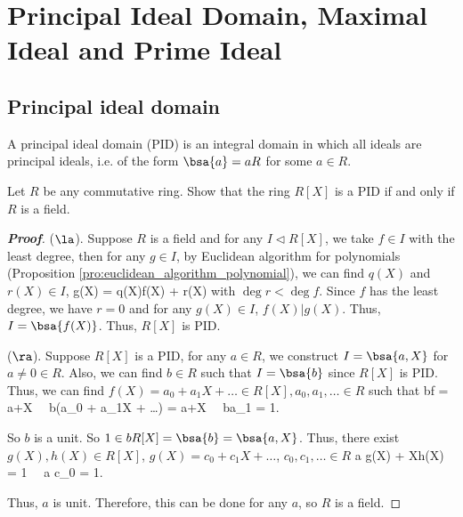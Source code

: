 

\section{Principal Ideal Domain, Maximal Ideal and Prime Ideal}

\subsection{Principal ideal domain}

\begin{definition}\label{def:principal_ideal_domain}
A principal ideal domain (PID) is an integral domain in which all ideals are principal ideals, i.e. of the form $\bsa{a} = aR$ for some $a \in R$.
\end{definition}


\begin{proposition}\label{pro:polynomial_pid_iff_field}
Let $R$ be any commutative ring. Show that the ring $R[X]$ is a PID if and only if $R$ is a field.%
\end{proposition}

\begin{proof}[\bf Proof]
($\la$). Suppose $R$ is a field and for any $I \lhd R[X]$, we take $f\in I$ with the least degree, then for any $g\in I$, by Euclidean algorithm for polynomials (Proposition \ref{pro:euclidean_algorithm_polynomial}), we can find $q(X)$ and $r(X)\in I$,
\be
g(X) = q(X)f(X) + r(X)
\ee
with $\deg r < \deg f$. Since $f$ has the least degree, we have $r = 0$ and for any $g(X)\in I$, $f(X)|g(X)$. Thus, $I = \bsa{f(X)}$. Thus, $R[X]$ is PID.

($\ra$). Suppose $R[X]$ is a PID, for any $a\in R$, we construct $I = \bsa{a,X}$ for $a\neq 0 \in R$. Also, we can find $b\in R$ such that $I = \bsa{b}$ since $R[X]$ is PID. Thus, we can find $f(X) = a_0 + a_1 X + \dots \in R[X], a_0,a_1,\dots \in R$ such that
\be
bf = a+X \ \ra \ b(a_0 + a_1X + \dots ) = a+X \ \ra \ ba_1 = 1.
\ee

So $b$ is a unit. So $1\in b R[X] = \bsa{b} = \bsa{a,X}$. Thus, there exist $g(X),h(X) \in R[X]$, $g(X) = c_0 + c_1 X + \dots$, $c_0,c_1,\dots \in R$
\be
a g(X) + Xh(X) = 1 \ \ra \ a c_0 = 1.
\ee

Thus, $a$ is unit. Therefore, this can be done for any $a$, so $R$ is a field.
\end{proof}

